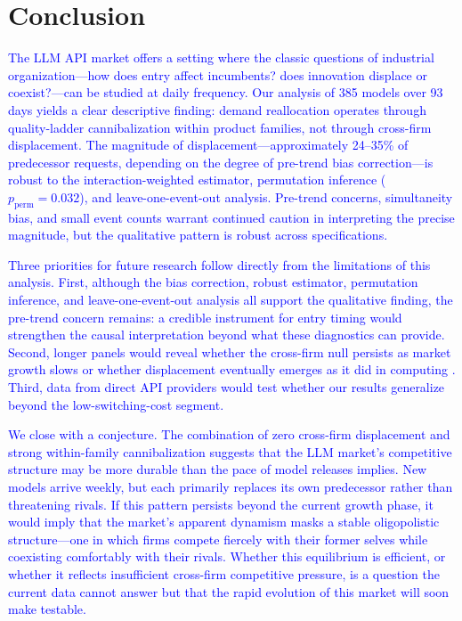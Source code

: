 \documentclass[11pt, a4paper]{article}
\begin{document}
\section{Conclusion}
\label{sec:conclusion}

\textcolor{blue}{The LLM API market offers a setting where the classic questions of industrial organization---how does entry affect incumbents? does innovation displace or coexist?---can be studied at daily frequency. Our analysis of 385 models over 93 days yields a clear descriptive finding: demand reallocation operates through quality-ladder cannibalization within product families, not through cross-firm displacement. The magnitude of displacement---approximately 24--35\% of predecessor requests, depending on the degree of pre-trend bias correction---is robust to the \citet{sunAbraham2021} interaction-weighted estimator, permutation inference ($p_{\text{perm}} = 0.032$), and leave-one-event-out analysis. Pre-trend concerns, simultaneity bias, and small event counts warrant continued caution in interpreting the precise magnitude, but the qualitative pattern is robust across specifications.}

\textcolor{blue}{Three priorities for future research follow directly from the limitations of this analysis. First, although the \citet{roth2022pretest} bias correction, \citet{sunAbraham2021} robust estimator, permutation inference, and leave-one-event-out analysis all support the qualitative finding, the pre-trend concern remains: a credible instrument for entry timing would strengthen the causal interpretation beyond what these diagnostics can provide. Second, longer panels would reveal whether the cross-firm null persists as market growth slows or whether displacement eventually emerges as it did in computing \citep{bresnahan1999technological}. Third, data from direct API providers would test whether our results generalize beyond the low-switching-cost segment.}

\textcolor{blue}{We close with a conjecture. The combination of zero cross-firm displacement and strong within-family cannibalization suggests that the LLM market's competitive structure may be more durable than the pace of model releases implies. New models arrive weekly, but each primarily replaces its own predecessor rather than threatening rivals. If this pattern persists beyond the current growth phase, it would imply that the market's apparent dynamism masks a stable oligopolistic structure---one in which firms compete fiercely with their former selves while coexisting comfortably with their rivals. Whether this equilibrium is efficient, or whether it reflects insufficient cross-firm competitive pressure, is a question the current data cannot answer but that the rapid evolution of this market will soon make testable.}
\end{document}
